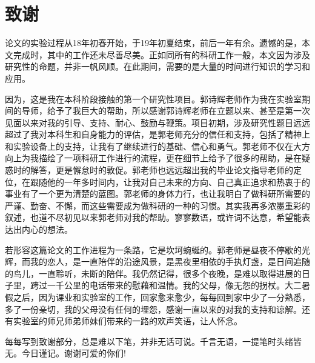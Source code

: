 

\chapter*{致谢}

论文的实验过程从18年初春开始，于19年初夏结束，前后一年有余。遗憾的是，本文完成时，其中的工作还未尽善尽美。正如同所有的科研工作一般，本文因为涉及研究性的命题，并非一帆风顺。在此期间，需要的是大量的时间进行知识的学习和应用。

因为，这是我在本科阶段接触的第一个研究性项目。郭诗辉老师作为我在实验室期间的导师，给予了我巨大的帮助，所以感谢郭诗辉老师在立题以来、甚至是第一次见面以来对我的引导、支持、耐心、鼓励与鞭策。项目初期，涉及研究性题目远远超过了我对本科生和自身能力的评估，是郭老师充分的信任和支持，包括了精神上和实验设备上的支持，让我有了继续进行的基础、信心和勇气。郭老师不仅在大方向上为我描绘了一项科研工作进行的流程，更在细节上给予了很多的帮助，是在疑惑时的解答，更是懈怠时的敦促。郭老师也远远超出我的毕业论文指导老师的定位，在跟随他的一年多时间内，让我对自己未来的方向、自己真正追求和热衷于的事业有了一个更为清楚的蓝图。郭老师的身体力行，也让我明白了做科研所需要的严谨、勤奋、不懈，而这些需要成为做科研的一种的习惯。其实我再多浓墨重彩的叙述，也道不尽初见以来郭老师对我的帮助。寥寥数语，或许词不达意，希望能表达出内心的想法。

若形容这篇论文的工作进程为一条路，它是坎坷蜿蜒的。郭老师是昼夜不停歇的光辉，而我的恋人，是一直陪伴的沿途风景，是黑夜里相依的手执灯盏，是日间追随的鸟儿，一直聆听，未断的陪伴。我仍然记得，很多个夜晚，是难以取得进展的日子里，跨过一千公里的电话带来的慰藉和温情。我的父母，像无怨的拐杖。大二暑假之后，因为课业和实验室的工作，回家愈来愈少，每每回到家中少了一分熟悉，多了一份亲切，我的父母没有任何的埋怨，感谢一直以来的对我的支持和谅解。还有实验室的师兄师弟师妹们带来的一路的欢声笑语，让人怀念。

每每写到致谢部分，总是难以下笔，并非无话可说。千言无语，一提笔时头绪皆无。今日谨记。谢谢可爱的你们!

%
%
%
